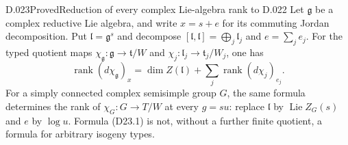 \begin{saresult}{D.023}{Proved}{Reduction of every complex Lie-algebra rank to D.022}
Let $\mathfrak g$ be a complex reductive Lie algebra, and write
$x=s+e$ for its commuting Jordan decomposition.  Put
$\mathfrak l=\mathfrak g^s$ and decompose
$[\mathfrak l,\mathfrak l]=\bigoplus_j\mathfrak l_j$ and
$e=\sum_j e_j$.  For the typed quotient maps
$\chi_{\mathfrak g}:\mathfrak g\to\mathfrak t/W$ and
$\chi_j:\mathfrak l_j\to\mathfrak t_j/W_j$, one has
\[
 \operatorname{rank}(d\chi_{\mathfrak g})_x
   =\dim Z(\mathfrak l)+
      \sum_j\operatorname{rank}(d\chi_j)_{e_j}.            \tag{D23.1}
\]
For a simply connected complex semisimple group $G$, the same
formula determines the rank of $\chi_G:G\to T/W$ at every
$g=su$: replace $\mathfrak l$ by $\operatorname{Lie}Z_G(s)$
and $e$ by $\log u$.  Formula (D23.1) is not, without a further
finite quotient, a formula for arbitrary isogeny types.
\end{saresult}
